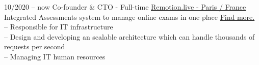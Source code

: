 \documentclass[9pt]{developercv}
\begin{document}
\begin{entrylist}
	\entry
	{10/2020 -- now}
	{Co-founder \& CTO - Full-time}
	{\href{https://remotion.live/}{Remotion.live - Paris / France }}
	{Integrated Assessments system to manage online exams in one place  \href{https://remotion.live/}{Find more.} \\
		-- Responsible for IT infrastructure  \\
		-- Design and developing an scalable architecture which can handle thousands of requests per second \\
		-- Managing IT human resources \\
	}
\end{entrylist}
\end{document}
